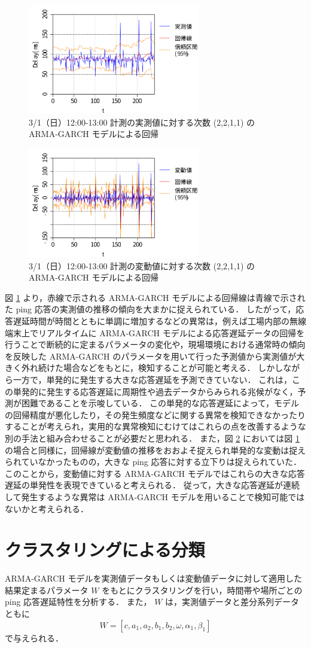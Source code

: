 \documentclass[technicalreport]{ieicej}
\begin{document}
\begin{figure}[tb]
\centering
\includegraphics[width=7.5cm]{0301_12-plot}
\caption{3/1（日）12:00-13:00 計測の実測値に対する次数 (2,2,1,1) のARMA-GARCH モデルによる回帰}
\label{norm-reg}
\end{figure}
\begin{figure}[tb]
\includegraphics[width=7.5cm]{0301_12-plot-diff}
\caption{3/1（日）12:00-13:00 計測の変動値に対する次数 (2,2,1,1) のARMA-GARCH モデルによる回帰}
\label{diff-reg}
\end{figure}

図 \ref{norm-reg} より，赤線で示される ARMA-GARCH モデルによる回帰線は青線で示された ping 応答の実測値の推移の傾向を大まかに捉えられている．
したがって，応答遅延時間が時間とともに単調に増加するなどの異常は，例えば工場内部の無線端末上でリアルタイムに ARMA-GARCH モデルによる応答遅延データの回帰を行うことで断続的に定まるパラメータの変化や，現場環境における通常時の傾向を反映した ARMA-GARCH のパラメータを用いて行った予測値から実測値が大きく外れ続けた場合などをもとに，検知することが可能と考える．
しかしながら一方で，単発的に発生する大きな応答遅延を予測できていない．
これは，この単発的に発生する応答遅延に周期性や過去データからみられる兆候がなく，予測が困難であることを示唆している．
この単発的な応答遅延によって，モデルの回帰精度が悪化したり，その発生頻度などに関する異常を検知できなかったりすることが考えられ，実用的な異常検知にむけてはこれらの点を改善するような別の手法と組み合わせることが必要だと思われる．
また，図 \ref{diff-reg} においては図 \ref{norm-reg} の場合と同様に，回帰線が変動値の推移をおおよそ捉えられ単発的な変動は捉えられていなかったものの，大きな ping 応答に対する立下りは捉えられていた．
このことから，変動値に対する ARMA-GARCH モデルではこれらの大きな応答遅延の単発性を表現できていると考えられる．
従って，大きな応答遅延が連続して発生するような異常は ARMA-GARCH モデルを用いることで検知可能ではないかと考えられる．
\section{クラスタリングによる分類}
 ARMA-GARCH モデルを実測値データもしくは変動値データに対して適用した結果定まるパラメータ $W$ をもとにクラスタリングを行い，時間帯や場所ごとの ping 応答遅延特性を分析する．
また， $W$ は，実測値データと差分系列データともに
$$W = [c, a_1, a_2, b_1, b_2, \omega, \alpha_1, \beta_1] $$
で与えられる．




\end{document}
